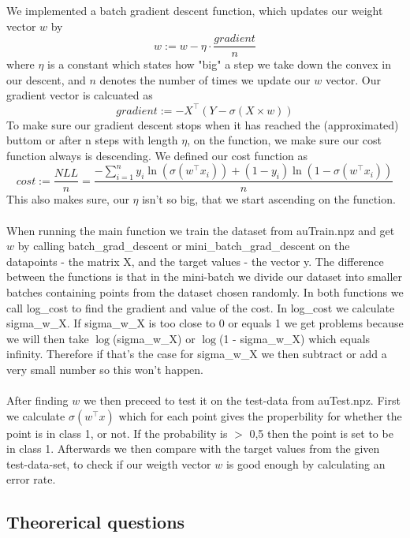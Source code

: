 \documentclass[paper=a4, fontsize=11pt]{scrartcl} %
\numberwithin{equation}{section} %
\numberwithin{figure}{section} %
\numberwithin{table}{section} %
\begin{document}
We implemented a batch gradient descent function, which updates our weight vector $w$ by
\begin{equation*}
w:= w - \eta\cdot \dfrac{gradient}{n}
\end{equation*}
where $\eta$ is a constant which states how "big" a step we take down the convex in our descent, and $n$ denotes the number of times we update our $w$ vector. Our gradient vector is calcuated as
\begin{equation*}
gradient:= -X^\intercal(Y-\sigma(X\times w))
\end{equation*}
To make sure our gradient descent stops when it has reached the (approximated) buttom or after n steps with length $\eta$, on the function, we make sure our cost function always is descending. We defined our cost function as
\begin{equation*}
cost := \dfrac{NLL}{n} = \dfrac{- \sum_{i=1}^n y_i \ln(\sigma(w^\intercal x_i)) + (1-y_i) \ln(1-\sigma(w^\intercal x_i))}{n}
\end{equation*}
This also makes sure, our $\eta$ isn't so big, that we start ascending on the function. \\ \\
When running the main function we train the dataset from auTrain.npz and get $w$ by calling batch{\_}grad{\_}descent or mini{\_}batch{\_}grad{\_}descent on the datapoints - the matrix X, and the target values - the vector y. The difference between the functions is that in the mini-batch we divide our dataset into smaller batches containing points from the dataset chosen randomly. In both functions we call log{\_}cost to find the gradient and value of the cost. In log{\_}cost we calculate sigma{\_}w{\_}X. If sigma{\_}w{\_}X is too close to 0 or equals 1 we get problems because we will then take $\log$(sigma{\_}w{\_}X) or $\log$(1 - sigma{\_}w{\_}X) which equals infinity. Therefore if that's the case for sigma{\_}w{\_}X we then subtract or add a very small number so this won't happen.
\\ \\
After finding $w$ we then preceed to test it on the test-data from auTest.npz. First we calculate $\sigma(w^\intercal x)$ which for each point gives the properbility for whether the point is in class 1, or not. If the probability is $>$ 0,5 then the point is set to be in class 1. Afterwards we then compare with the target values from the given test-data-set, to check if our weigth vector $w$ is good enough by calculating an error rate.
    
\subsection*{Theorerical questions}
\end{document}
